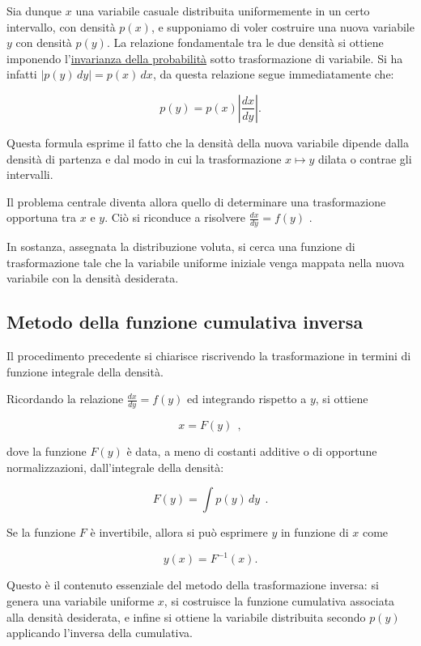 Sia dunque $x$ una variabile casuale distribuita uniformemente in un certo intervallo, con densità $p(x)$, e supponiamo di voler costruire una nuova variabile $y$ con densità $p(y)$. La relazione fondamentale tra le due densità si ottiene imponendo l'\underline{invarianza della probabilità} sotto trasformazione di variabile.
Si ha infatti $|p(y)\,dy| = p(x)\,dx$, da questa relazione segue immediatamente che:

\[
p(y) = p(x)\left|\frac{dx}{dy}\right| .
\]

Questa formula esprime il fatto che la densità della nuova variabile dipende dalla densità di partenza e dal modo in cui la trasformazione $x \mapsto y$ dilata o contrae gli intervalli.

Il problema centrale diventa allora quello di determinare una trasformazione opportuna tra $x$ e $y$. Ciò si riconduce a risolvere
$\frac{dx}{dy} = f(y)$ .

In sostanza, assegnata la distribuzione voluta, si cerca una funzione di trasformazione tale che la variabile uniforme iniziale venga mappata nella nuova variabile con la densità desiderata.

%
%
%
\vspace{0.5cm}
\subsection{Metodo della funzione cumulativa inversa}

Il procedimento precedente si chiarisce riscrivendo la trasformazione in termini di funzione integrale della densità.

Ricordando la relazione $\frac{dx}{dy} = f(y)$ ed integrando rispetto a $y$, si ottiene

\[ x = F(y)\ \ ,\]

dove la funzione $F(y)$ è data, a meno di costanti additive o di opportune normalizzazioni, dall'integrale della densità:

\[ F(y) = \int p(y)\,dy\ \ . \]

Se la funzione $F$ è invertibile, allora si può esprimere $y$ in funzione di $x$ come

\[
y(x) = F^{-1}(x).
\]

Questo è il contenuto essenziale del metodo della trasformazione inversa: si genera una variabile uniforme $x$, si costruisce la funzione cumulativa associata alla densità desiderata, e infine si ottiene la variabile distribuita secondo $p(y)$ applicando l'inversa della cumulativa.

